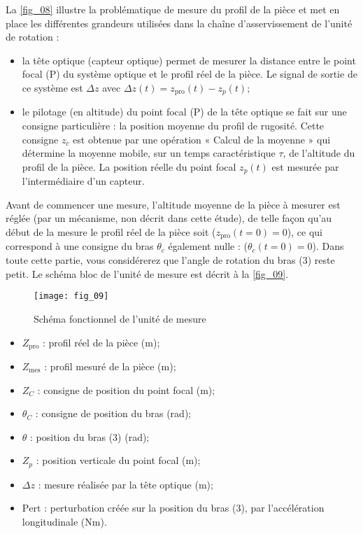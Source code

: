 La \autoref{fig_08} illustre la problématique de mesure du profil de la pièce et met en place les différentes
grandeurs utilisées dans la chaîne d’asservissement de l’unité de rotation :
\begin{itemize}
\item la tête optique (capteur optique) permet de mesurer la distance entre le point focal (P) du système
optique et le profil réel de la pièce. Le signal de sortie de ce système est $\Delta z$ avec
$\Delta z(t)=z_{\text{pro}}(t)-z_p(t)$;
\item le pilotage (en altitude) du point focal (P) de la tête optique se fait sur une consigne particulière : la
position moyenne du profil de rugosité. Cette consigne $z_c$ est obtenue par une opération « Calcul de
la moyenne » qui détermine la moyenne mobile, sur un temps caractéristique $\tau$, de l’altitude du
profil de la pièce. La position réelle du point focal $z_p(t)$ est mesurée par l’intermédiaire d’un
capteur.
\end{itemize}
Avant de commencer une mesure, l’altitude moyenne de la pièce à mesurer est réglée (par un mécanisme,
non décrit dans cette étude), de telle façon qu’au début de la mesure le profil réel de la pièce soit
($z_{\text{pro}}(t=0)=0$), ce qui correspond à une consigne du bras $\theta_c$ également nulle : ($\theta_{c}(t=0)=0$).
Dans toute cette partie, vous considérerez que l’angle de rotation du bras (3) reste petit.
Le schéma bloc de l’unité de mesure est décrit à la \autoref{fig_09}.


\begin{figure}[H]
\centering
\texttt{[image: fig\_09]}
\caption{\label{fig_09} Schéma fonctionnel de l’unité de mesure}
\end{figure}

\begin{multicols}{2}
\begin{itemize}
\item $Z_{\text{pro}}$ : profil réel de la pièce (m);
\item $Z_{\text{mes}}$ : profil mesuré de la pièce (m);
\item $Z_{C}$ : consigne de position du point focal (m);
\item $\theta_{C}$ : consigne de position du bras (\si{rad});
\item $\theta$ : position du bras (3) (\si{rad});
\item $Z_{p}$ : position verticale du point focal (m);
\item $\Delta z$ : mesure réalisée par la tête optique (m);
\item $\text{Pert}$ : perturbation créée sur la position du bras (3), par l'accélération longitudinale (\si{Nm}).
\end{itemize}
\end{multicols}


